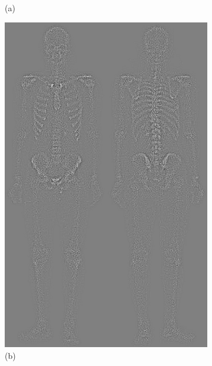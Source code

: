 \begin{figure}[h!]
\begin{subfigure}[b]{0.4\linewidth}
		\caption*{(a)}
		\label{fig:2a}
	\end{subfigure}
	\begin{subfigure}[b]{0.4\linewidth}
    	\includegraphics[width=\linewidth]{myfigure/p2/2-b.png}
		\caption*{(b)}
		\label{fig:2b}
  	\end{subfigure}
  	\begin{subfigure}[b]{0.4\linewidth}

\end{subfigure}
\end{figure}
